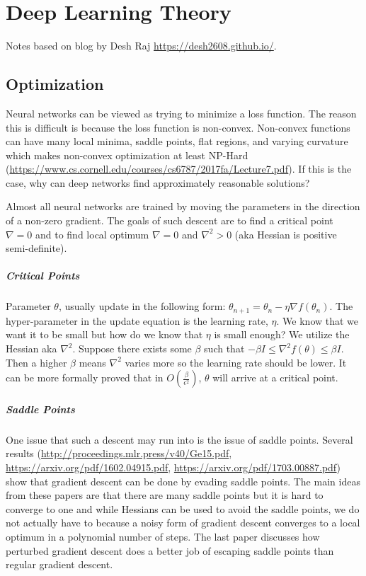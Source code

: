 \chapter{Deep Learning Theory}
Notes based on blog by Desh Raj  \url{https://desh2608.github.io/}.

\section{Optimization}
Neural networks can be viewed as trying to minimize a loss function. The reason this is difficult is because the loss function is non-convex. Non-convex functions can have many local minima, saddle points, flat regions, and varying curvature which makes non-convex optimization at least NP-Hard (\url{https://www.cs.cornell.edu/courses/cs6787/2017fa/Lecture7.pdf}). If this is the case, why can deep networks find approximately reasonable solutions?

Almost all neural networks are trained by moving the parameters in the direction of a non-zero gradient. The goals of such descent are to find a critical point $\nabla =0$ and to find local optimum $\nabla =0$ and $\nabla^{2} >0$ (aka Hessian is positive semi-definite). 

\paragraph{Critical Points}
Parameter $\theta$, usually update in the following form: $\theta_{n+1} = \theta_{n} - \eta \nabla f(\theta_n)$. The hyper-parameter in the update equation is the learning rate, $\eta$. We know that we want it to be small but how do we know that $\eta$ is small enough? We utilize the Hessian aka $\nabla^2$. Suppose there exists some $\beta$ such that $-\beta I \leq \nabla^2 f(\theta) \leq \beta I$. Then a higher $\beta$ means $\nabla^2$ varies more so the learning rate should be lower. It can be more formally proved that in $O(\frac{\beta}{\epsilon^2})$, $\theta$ will arrive at a critical point.

\paragraph{Saddle Points}
One issue that such a descent may run into is the issue of saddle points. Several results (\url{http://proceedings.mlr.press/v40/Ge15.pdf}, \url{https://arxiv.org/pdf/1602.04915.pdf}, \url{https://arxiv.org/pdf/1703.00887.pdf}) show that gradient descent can be done by evading saddle points. The main ideas from these papers are that there are many saddle points but it is hard to converge to one and while Hessians can be used to avoid the saddle points, we do not actually have to because a noisy form of gradient descent converges to a local optimum in a polynomial number of steps. The last paper discusses how perturbed gradient descent does a better job of escaping saddle points than regular gradient descent. 